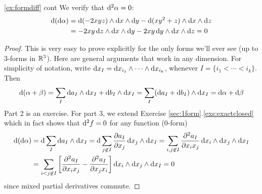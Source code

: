 
\goodbreak

\begin{example*}{\ref*{ex:formdiff} cont}{}
We verify that $\D^2\alpha=0$:
\begin{align*}
\D(\D\alpha)&=\D(-2xyz)\wedge\dx\wedge\dy -\D(xy^2+z)\wedge\dx\wedge\dz\\
&=-2xy\,\dz\wedge\dx\wedge\dy -2xy\,\dy\wedge\dx\wedge\dz =0
\end{align*}
\end{example*}

\begin{proof}
This is very easy to prove explicitly for the only forms we'll ever see (up to 3-forms in $\R^3$). Here are general arguments that work in any dimension.\smallbreak
For simplicity of notation, write $\dx_I=\dx_{i_1}\wedge\dots\wedge\dx_{i_k}$, whenever $I=\{i_1<\cdots<i_k\}$. Then
\[\D(\alpha+\beta)=\sum_I\D a_I\wedge\dx_I+\D b_I\wedge\dx_I =\sum_I(\D a_I+\D b_I)\wedge\dx_I =\D\alpha+\D\beta\]
Part 2 is an exercise. For part 3, we extend Exercise \ref*{sec:1form}.\ref{exs:exactclosed} which in fact shows that $\D^2f=0$ for any function (0-form) 
\begin{align*}
\D(\D\alpha)&=\D\sum_I\D a_I\wedge\dx_I =\D\sum_{j\not\in I}\partials[a_I]{x_j}\,\dx_j\wedge\dx_I =\sum_{i,j\not\in I}\partials[^2a_I]{x_ix_j}\,\dx_i\wedge\dx_j\wedge\dx_I \\
&=\sum_{i<j\not\in I}\left[\partials[^2a_I]{x_ix_j}-\partials[^2a_I]{x_jx_i}\right]\dx_i\wedge\dx_j\wedge\dx_I =0
\end{align*}
since mixed partial derivatives commute.
\end{proof}




